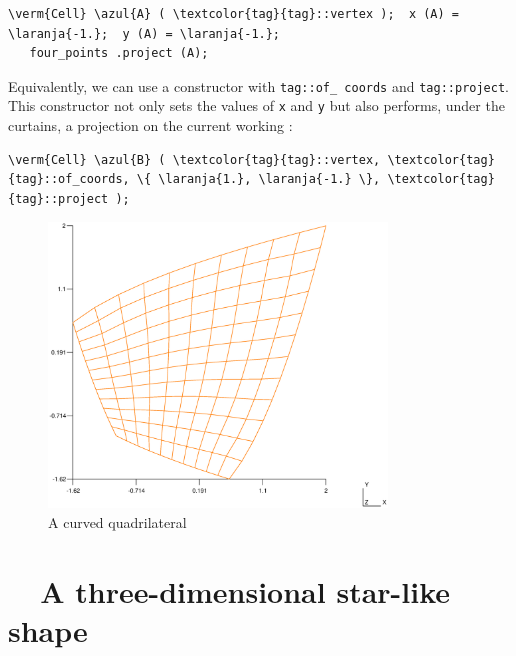 \begin{Verbatim}[commandchars=\\\{\},formatcom=\small\tt,baselinestretch=0.94]
   \verm{Cell} \azul{A} ( \textcolor{tag}{tag}::vertex );  x (A) = \laranja{-1.};  y (A) = \laranja{-1.};
   four_points .project (A);
\end{Verbatim}

Equivalently, we can use a constructor with {\small\tt\textcolor{tag}{tag}::of\_\,coords} and
{\small\tt\textcolor{tag}{tag}::project}.
This constructor not only sets the values of {\small\tt x} and {\small\tt y} but also
performs, under the curtains, a projection on the current working {\small\tt{}} :

\begin{Verbatim}[commandchars=\\\{\},formatcom=\small\tt,frame=single,
   label=parag-\ref{\numb section 2.\numb parag 12}.cpp,rulecolor=\color{moldura},
   baselinestretch=0.94,framesep=2mm]
   \verm{Cell} \azul{B} ( \textcolor{tag}{tag}::vertex, \textcolor{tag}{tag}::of_coords, \{ \laranja{1.}, \laranja{-1.} \}, \textcolor{tag}{tag}::project );
\end{Verbatim}

\begin{figure}[ht] \centering
  \includegraphics[width=90mm]{two-parab}
  \caption{A curved quadrilateral}
  \label{\numb section 2.\numb fig 12}
\end{figure}


\section{~~A three-dimensional star-like shape}\label{\numb section 2.\numb parag 13}

